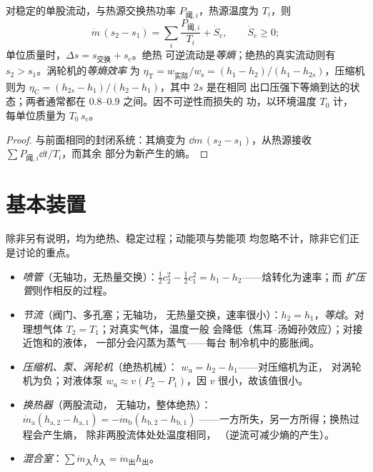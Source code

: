 \begin{theorem}[稳定流动的熵平衡]\label{thm:b2:open-systems:secondlaw}
对稳定的单股流动，与热源交换热功率
$P_{\text{阈},i}$，热源温度为 $T_i$，则
\[
\dot m\,(s_2 - s_1) = \sum_i\frac{P_{\text{阈},i}}{T_i} + \dot S_{\text{c}},
\qquad \dot S_{\text{c}} \ge 0 ;
\]
单位质量时，$\Delta s = s_{\text{交换}} + s_{\text{c}}$。绝热
可逆流动是\emph{等熵}；绝热的真实流动则有 $s_2 >
s_1$。涡轮机的\emph{等熵效率}
为 $\eta_{\text{T}} = w_{\text{实际}}/w_{\text{s}} = (h_1 - h_2)/(h_1
- h_{2s})$，压缩机则为 $\eta_{\text{C}} = (h_{2s} - h_1)/(h_2 -
h_1)$，其中 $2s$ 是在相同
出口压强下等熵到达的状态；两者通常都在 $0.8$--$0.9$ 之间。因不可逆性而损失的
功，以环境温度 $T_0$ 计，
每单位质量为 $T_0\,s_{\text{c}}$。
\end{theorem}

\begin{proof}
与前面相同的封闭系统：其熵变为 $\dd m\,(s_2 -
s_1)$，从热源接收 $\sum P_{\text{阈},i}\dd t/T_i$，而其余
部分为新产生的熵。
\end{proof}

\section{基本装置}

\begin{proposition}\label{prop:b2:open-systems:devices}
除非另有说明，均为绝热、稳定过程；动能项与势能项
均忽略不计，除非它们正是讨论的重点。
\begin{itemize}
\item \emph{喷管}（无轴功，无热量交换）：$\tfrac12c_2^2 -
      \tfrac12c_1^2 = h_1 - h_2$——焓转化为速率；而
      \emph{扩压管}则作相反的过程。
\item \emph{节流}（阀门、多孔塞；无轴功，
      无热量交换，速率很小）：$h_2 = h_1$，\emph{等焓}。对理想气体
      $T_2 = T_1$；对真实气体，温度一般
      会降低（焦耳–汤姆孙效应）；对接近饱和的液体，
      一部分会闪蒸为蒸气——每台
      制冷机中的膨胀阀。
\item \emph{压缩机、泵、涡轮机}（绝热机械）：
      $w_{\text{u}} = h_2 - h_1$——对压缩机为正，
      对涡轮机为负；对液体泵 $w_{\text{u}} \approx
      v(P_2 - P_1)$，因 $v$ 很小，故该值很小。
\item \emph{换热器}（两股流动，
      无轴功，整体绝热）：$\dot m_{\text{a}}(h_{\text{a},2} -
      h_{\text{a},1}) = -\dot m_{\text{b}}(h_{\text{b},2} - h_{\text{b},1})$
——一方所失，另一方所得；换热过程会产生熵，
      除非两股流体处处温度相同，
      （逆流可减少熵的产生）。
\item \emph{混合室}：$\sum\dot m_{\text{入}}h_{\text{入}} = \dot
      m_{\text{出}}h_{\text{出}}$。
\end{itemize}
\end{proposition}

